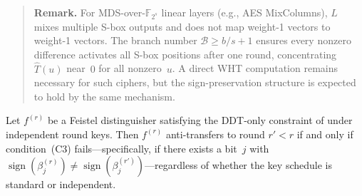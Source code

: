 \documentclass[runningheads]{llncs}
\begin{document}
\begin{quote}\small
\textbf{Remark.}
For MDS-over-$\mathbb{F}_{2^s}$ linear layers (e.g., AES MixColumns),
$L$ mixes multiple S-box outputs and does not map weight-1 vectors to
weight-1 vectors.
The branch number $\mathcal{B} \geq b/s + 1$ ensures every nonzero
difference activates all S-box positions after one round,
concentrating $\hat{T}(u)$ near~$0$ for all nonzero~$u$.
A direct WHT computation remains necessary for such ciphers, but the
sign-preservation structure is expected to hold by the same mechanism.
\end{quote}


\begin{proposition}
\label{prop:irk}
Let $f^{(r)}$ be a Feistel distinguisher satisfying the DDT-only
constraint of\/ {\rm\cite{gohr2022assessment}} under independent round
keys.
Then $f^{(r)}$ anti-transfers to round $r' < r$ if and only if
condition~\textup{(C3)} fails---specifically, if there exists a bit~$j$
with
$\operatorname{sign}(\beta_j^{(r)}) \neq
 \operatorname{sign}(\beta_j^{(r')})$---regardless of whether the key
schedule is standard or independent.
\end{proposition}
\end{document}
